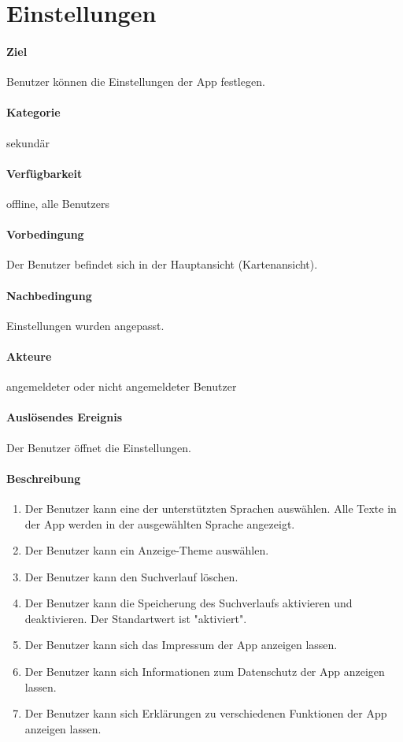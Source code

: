 \section{Einstellungen}
\paragraph{Ziel}
\Gls{Benutzer} können die Einstellungen der App festlegen.
\paragraph{Kategorie}
sekundär
\paragraph{Verfügbarkeit}
offline, alle \Glspl{Benutzer}
\paragraph{Vorbedingung}
Der \Gls{Benutzer} befindet sich in der Hauptansicht (\Gls{Kartenansicht}).
\paragraph{Nachbedingung}
Einstellungen wurden angepasst.
\paragraph{Akteure}
angemeldeter oder nicht angemeldeter \Gls{Benutzer}
\paragraph{Auslösendes Ereignis}
Der \Gls{Benutzer} öffnet die Einstellungen.
\paragraph{Beschreibung}
\begin{enumerate}[start=50, label=\textbf{/FA\arabic*/}, align=left]
    \item Der \Gls{Benutzer} kann eine der unterstützten Sprachen auswählen. Alle Texte in der App werden in der ausgewählten Sprache angezeigt.
    \item Der \Gls{Benutzer} kann ein Anzeige-\Gls{Theme} auswählen.
    \item Der \Gls{Benutzer} kann den \Gls{Suchverlauf} löschen.
    \item Der \Gls{Benutzer} kann die Speicherung des \Gls{Suchverlauf}s aktivieren und deaktivieren. Der Standartwert ist "aktiviert".
    \item Der \Gls{Benutzer} kann sich das Impressum der App anzeigen lassen.
    \item Der \Gls{Benutzer} kann sich Informationen zum Datenschutz der App anzeigen lassen.
    \item Der \Gls{Benutzer} kann sich Erklärungen zu verschiedenen Funktionen der App anzeigen lassen.
\end{enumerate}